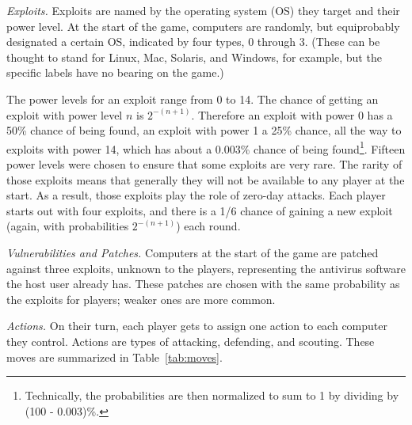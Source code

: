 \documentclass{sig-alternate-05-2015}
\begin{document}
{\em Exploits.}
Exploits are named by the operating system (OS) they target and their power level.
At the start of the game, computers are randomly, but equiprobably designated a certain OS, indicated by four types, 0 through 3. 
(These can be thought to stand for Linux, Mac, Solaris, and Windows, for example, but the specific labels have no bearing on the game.) 

The power levels for an exploit range from 0 to 14. 
The chance of getting an exploit with power level $n$ is $2^{-(n+1)}$. 
Therefore an exploit with power 0 has a 50\% chance of being found, an exploit with power 1 a 25\% chance, all the way to exploits with power 14, which has about a 0.003\% chance of being found\footnote{Technically, the probabilities are then normalized to sum to 1 by dividing by (100 - 0.003)\%.}. 
Fifteen power levels were chosen to ensure that some exploits are very rare.
The rarity of those exploits means that generally they will not be available to any player at the start.
As a result, those exploits play the role of zero-day attacks.
Each player starts out with four exploits, and there is a 1/6 chance of gaining a new exploit (again, with probabilities $2^{-(n+1)}$) each round. 

{\em Vulnerabilities and Patches.}
Computers at the start of the game are patched against three exploits, unknown to the players, representing the antivirus software the host user already has. These patches are chosen with the same probability as the exploits for players; weaker ones are more common. 


{\em Actions.}
On their turn, each player gets to assign one action to each computer they control.
Actions are types of attacking, defending, and scouting. These moves are summarized in Table~\ref{tab:moves}.
	
\end{document}

